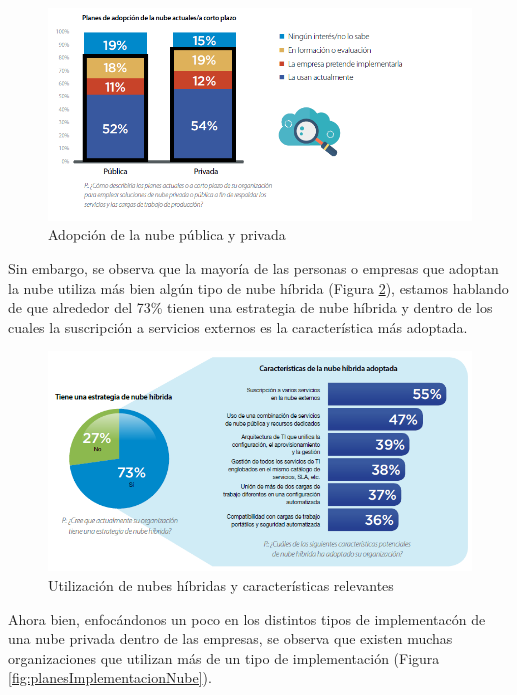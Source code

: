 \documentclass[a4paper, 12pt]{report}
\begin{document}
\begin{justify}
\begin{figure}[ht]
	\begin{center}
		\includegraphics[width=.8\textwidth]{adopcionDeLaNube}
		\caption{Adopci\'on de la nube p\'ublica y privada}
		\label{fig:adopcionDeLaNube}
	\end{center}
\end{figure}

Sin embargo, se observa que la mayor\'ia de las personas o empresas que adoptan la nube utiliza m\'as bien alg\'un tipo de nube h\'ibrida (Figura \ref{fig:utlizacionDeNubesHibridas}), estamos hablando de que alrededor del 73\% tienen una estrategia de nube h\'ibrida y dentro de los cuales la suscripci\'on a servicios externos es la caracter\'istica m\'as adoptada.\par

\begin{figure}[ht]
	\begin{center}
		\includegraphics[width=.8\textwidth]{utlizacionDeNubesHibridas}
		\caption{Utilizaci\'on de nubes h\'ibridas y caracter\'isticas relevantes}
		\label{fig:utlizacionDeNubesHibridas}
	\end{center}
\end{figure}

Ahora bien, enfoc\'andonos un poco en los distintos tipos de implementac\'on de una nube privada dentro de las empresas, se observa que existen muchas organizaciones que utilizan m\'as de un tipo de implementaci\'on (Figura \ref{fig:planesImplementacionNube}).\par


\end{justify}
\end{document}
